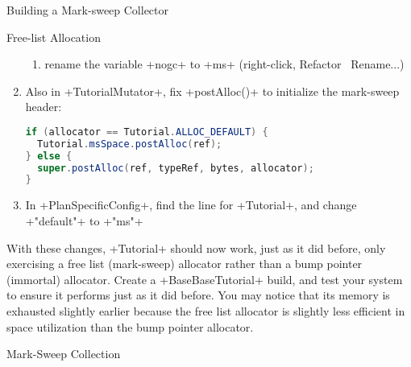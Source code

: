 \begin{chapter}{Building a Mark-sweep Collector}
\begin{section}{Free-list Allocation}
\begin{enumerate}
\begin{enumerate}
      \item rename the variable \spverb+nogc+ to \spverb+ms+ (right-click, Refactor \textrightarrow\ Rename...)
    \end{enumerate}
  \item Also in \spverb+TutorialMutator+, fix \spverb+postAlloc()+ to initialize the mark-sweep header:
\begin{lstlisting}[language=Java] 
if (allocator == Tutorial.ALLOC_DEFAULT) {
  Tutorial.msSpace.postAlloc(ref);
} else {
  super.postAlloc(ref, typeRef, bytes, allocator);
}
\end{lstlisting}
  \item In \spverb+PlanSpecificConfig+, find the line for \spverb+Tutorial+, and change \spverb+"default"+ to \spverb+"ms"+
\end{enumerate}

With these changes, \spverb+Tutorial+ should now work, just as it did before, only exercising a free list (mark-sweep) allocator rather than a bump pointer (immortal) allocator. Create a \spverb+BaseBaseTutorial+ build, and test your system to ensure it performs just as it did before. You may notice that its memory is exhausted slightly earlier because the free list allocator is slightly less efficient in space utilization than the bump pointer allocator.

\end{section}

\begin{section}{Mark-Sweep Collection}


\end{section}
\end{chapter}
